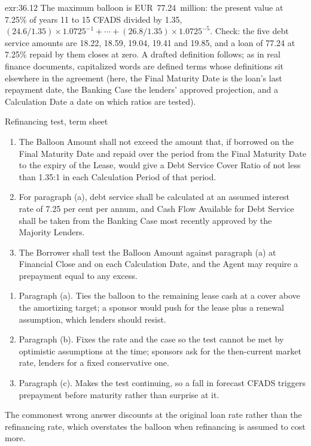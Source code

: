 \begin{solution}{exr:36.12}
The maximum balloon is EUR~77.24~million: the present value at 7.25\% of years 11 to 15 CFADS divided by 1.35, $(24.6/1.35) \times 1.0725^{-1} + \cdots + (26.8/1.35) \times 1.0725^{-5}$. Check: the five debt service amounts are 18.22, 18.59, 19.04, 19.41 and 19.85, and a loan of 77.24 at 7.25\% repaid by them closes at zero. A drafted definition follows; as in real finance documents, capitalized words are defined terms whose definitions sit elsewhere in the agreement (here, the Final Maturity Date is the loan's last repayment date, the Banking Case the lenders' approved projection, and a Calculation Date a date on which ratios are tested).
\begin{clause}{Refinancing test, term sheet \illustrative}\label{cl:36.1}
\begin{enumerate}[label=(\alph*)]
\item The Balloon Amount shall not exceed the amount that, if borrowed on the Final Maturity Date and repaid over the period from the Final Maturity Date to the expiry of the Lease, would give a Debt Service Cover Ratio of not less than 1.35:1 in each Calculation Period of that period.
\item For paragraph (a), debt service shall be calculated at an assumed interest rate of 7.25 per cent per annum, and Cash Flow Available for Debt Service shall be taken from the Banking Case most recently approved by the Majority Lenders.
\item The Borrower shall test the Balloon Amount against paragraph (a) at Financial Close and on each Calculation Date, and the Agent may require a prepayment equal to any excess.
\end{enumerate}
\end{clause}
\begin{enumerate}
\item Paragraph (a). Ties the balloon to the remaining lease cash at a cover above the amortizing target; a sponsor would push for the lease plus a renewal assumption, which lenders should resist.
\item Paragraph (b). Fixes the rate and the case so the test cannot be met by optimistic assumptions at the time; sponsors ask for the then-current market rate, lenders for a fixed conservative one.
\item Paragraph (c). Makes the test continuing, so a fall in forecast CFADS triggers prepayment before maturity rather than surprise at it.
\end{enumerate}
The commonest wrong answer discounts at the original loan rate rather than the refinancing rate, which overstates the balloon when refinancing is assumed to cost more.
\end{solution}

